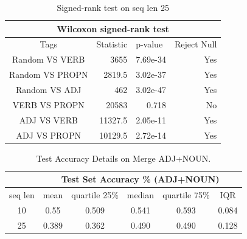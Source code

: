 \documentclass[12pt]{article}
\begin{document}
\begin{table}[!h]
\begin{center}
\fontsize{10pt}{10pt}\selectfont
\begin{tabular}{|crrr|}
\hline
\multicolumn{4}{|c|}{Wilcoxon signed-rank test}                                                                                           \\ \hline
\multicolumn{1}{|c|}{Tags}            & \multicolumn{1}{c|}{Statistic} & \multicolumn{1}{l|}{p-value}  & \multicolumn{1}{l|}{Reject Null} \\ \hline
\multicolumn{1}{|c|}{Random VS VERB}  & \multicolumn{1}{r|}{3655}      & \multicolumn{1}{r|}{7.69e-34} & Yes                              \\ \hline
\multicolumn{1}{|c|}{Random VS PROPN} & \multicolumn{1}{r|}{2819.5}    & \multicolumn{1}{r|}{3.02e-37} & Yes                              \\ \hline
\multicolumn{1}{|c|}{Random VS ADJ}   & \multicolumn{1}{r|}{462}       & \multicolumn{1}{r|}{3.02e-47} & Yes                              \\ \hline
\multicolumn{1}{|c|}{VERB VS PROPN}   & \multicolumn{1}{r|}{20583}     & \multicolumn{1}{r|}{0.718}    & No                               \\ \hline
\multicolumn{1}{|c|}{ADJ VS VERB}     & \multicolumn{1}{r|}{11327.5}   & \multicolumn{1}{r|}{2.05e-11} & Yes                              \\ \hline
\multicolumn{1}{|c|}{ADJ VS PROPN}    & \multicolumn{1}{r|}{10129.5}   & \multicolumn{1}{r|}{2.72e-14} & Yes                              \\ \hline
\end{tabular}
\caption{Signed-rank test on seq len 25}
\label{appendix:signedranktestseq25}
\end{center}    
\end{table}

\begin{table}[!h]
\fontsize{10pt}{10pt}\selectfont
\begin{tabular}{c|ccccc|}
\cline{2-6}
\multicolumn{1}{l|}{}         & \multicolumn{5}{c|}{Test Set Accuracy \% (ADJ+NOUN)}                                                                                       \\ \hline
\multicolumn{1}{|c|}{seq len} & \multicolumn{1}{c|}{mean}  & \multicolumn{1}{c|}{quartile 25\%} & \multicolumn{1}{c|}{median} & \multicolumn{1}{c|}{quartile 75\%} & IQR   \\ \hline
\multicolumn{1}{|c|}{10}      & \multicolumn{1}{c|}{0.55}  & \multicolumn{1}{c|}{0.509}         & \multicolumn{1}{c|}{0.541}  & \multicolumn{1}{c|}{0.593}         & 0.084 \\ \hline
\multicolumn{1}{|c|}{25}      & \multicolumn{1}{c|}{0.389} & \multicolumn{1}{c|}{0.362}         & \multicolumn{1}{c|}{0.490}  & \multicolumn{1}{c|}{0.490}         & 0.128 \\ \hline
\end{tabular}
\caption{Test Accuracy Details on Merge ADJ+NOUN.}
\label{appendix:adjnounMerge}
\end{table}
\end{document}
